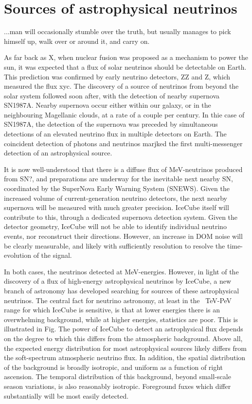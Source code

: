 \setchapterpreamble[u]{\margintoc}
\chapter{Sources of astrophysical neutrinos}
\begin{fquote}...man will occasionally stumble over the truth, but usually manages to pick himself up, walk over or around it, and carry on. 
\end{fquote}
As far back as X, when nuclear fusion was proposed as a mechanism to power the sun, it was expected that a flux of solar neutrinos should be detectable on Earth. This prediction was confirmed by early neutrino detectors, ZZ and Z, which measured the flux xyc.
The discovery of a source of neutrinos from beyond the solar system followed soon after, with the detection of nearby supernova SN1987A. Nearby supernova occur either within our galaxy, or in the neighbouring Magellanic clouds, at a rate of a couple per century. In thie case of SN1987A, the detection of the supernova was preceded by simultaneous detections of an elevated neutrino flux in multiple detectors on Earth. The coincident detection of photons and neutrinos marjked the first multi-messenger detection of an astrophysical source.

It is now well-understood that there is a diffuse flux of MeV-neutrinos produced from SN?, and preparations are underway for the inevitable next nearby SN, coordinated by the SuperNova Early Warning System (SNEWS). Given the increased volume of current-generation neutrino detectors, the next nearby supernova will be measured with much greater precision. IceCube itself will contribute to this, through a dedicated supernova detection system. Given the detector geometry, IceCube will not be able to identify individual neutrino events, nor reconstruct their directions. However, an increase in DOM noise will be clearly measurable, and likely with sufficiently resolution to resolve the time-evolution of the signal. 

In both cases, the neutrinos detected at MeV-energies.  However, in light of the discovery of a flux of high-energy astrophysical neutrinos by IceCube, a new branch of astronomy has developed searching for sources of these astrophysical neutrinos. The central fact for neutrino astronomy, at least in the ~TeV-PeV range for which IceCube is sensitive, is that at lower energies there is an overwhelming background, while at higher energies, statistics are poor. This is illustrated in Fig. The power of IceCube to detect an astrophysical flux depends on the degree to which this differs from the atmospheric background. Above all, the expected energy distribution for most astrophysical sources likely differs from the soft-spectrum atmospheric neutrino flux. In addition, the spatial distribution of the background is broadly isotropic, and uniform as a function of right ascension. The temporal distribution of this background, beyond small-scale season variations, is also reasonably isotropic. Foreground fuxes which differ substantially will be most easily detected.

